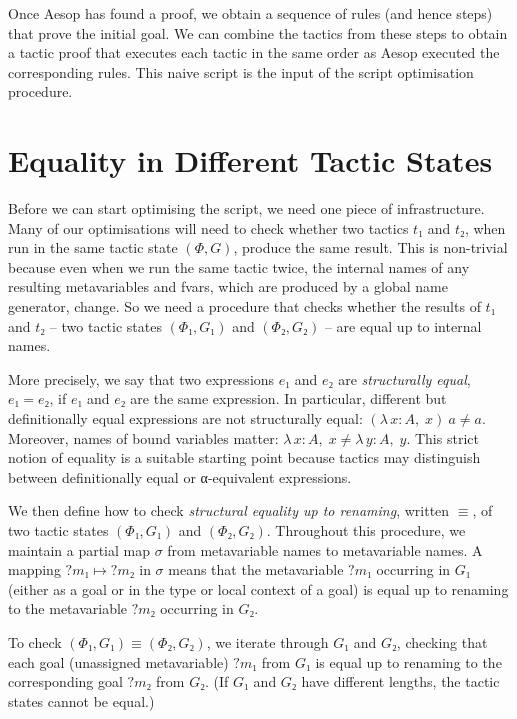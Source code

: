 \documentclass[sigplan,10pt,anonymous,review]{acmart}
\newcommand{\Lam}[2]{λ\,#1,\; #2}
\newcommand{\mvar}[1]{{?#1}}
\begin{document}
\medskip

Once Aesop has found a proof, we obtain a sequence of rules (and hence steps) that prove the initial goal.
We can combine the tactics from these steps to obtain a tactic proof that executes each tactic in the same order as Aesop executed the corresponding rules.
This naive script is the input of the script optimisation procedure.

\section{Equality in Different Tactic States}%
\label{sec:equality}

Before we can start optimising the script, we need one piece of infrastructure.
Many of our optimisations will need to check whether two tactics $t₁$ and $t₂$, when run in the same tactic state $(Φ, G)$, produce the same result.
This is non-trivial because even when we run the same tactic twice, the internal names of any resulting metavariables and fvars, which are produced by a global name generator, change.
So we need a procedure that checks whether the results of $t₁$ and $t₂$ -- two tactic states $(Φ₁, G₁)$ and $(Φ₂, G₂)$ -- are equal up to internal names.

More precisely, we say that two expressions $e₁$ and $e₂$ are \emph{structurally equal}, $e₁ = e₂$, if $e₁$ and $e₂$ are the same expression.
In particular, different but definitionally equal expressions are not structurally equal: $(\Lam{x : A}{x})~a ≠ a$.
Moreover, names of bound variables matter: $\Lam{x : A}{x} ≠ \Lam{y : A}{y}$.
This strict notion of equality is a suitable starting point because tactics may distinguish between definitionally equal or α-equivalent expressions.

We then define how to check \emph{structural equality up to renaming}, written $≡$, of two tactic states $(Φ₁, G₁)$ and $(Φ₂, G₂)$.
Throughout this procedure, we maintain a partial map $σ$ from metavariable names to metavariable names.
A mapping $\mvar{m₁} ↦ \mvar{m₂}$ in $σ$ means that the metavariable $\mvar{m₁}$ occurring in $G₁$ (either as a goal or in the type or local context of a goal) is equal up to renaming to the metavariable $\mvar{m₂}$ occurring in $G₂$.

To check $(Φ₁, G₁) ≡ (Φ₂, G₂)$, we iterate through $G₁$ and $G₂$, checking that each goal (unassigned metavariable) $\mvar{m₁}$ from $G₁$ is equal up to renaming to the corresponding goal $\mvar{m₂}$ from $G₂$.
(If $G₁$ and $G₂$ have different lengths, the tactic states cannot be equal.)
\end{document}
